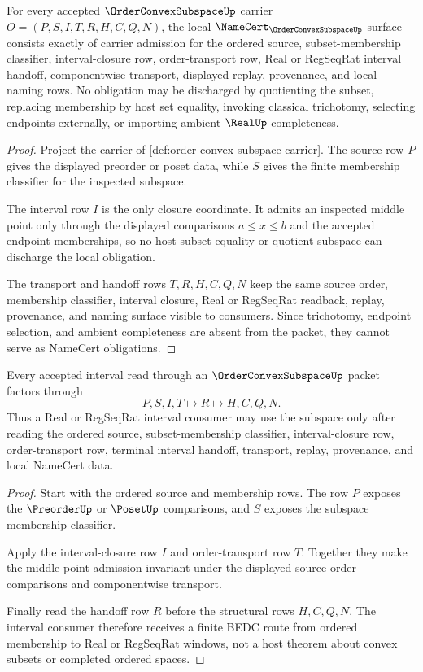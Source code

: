 \begin{theorem}
\label{thm:order-convex-subspace-namecert-obligations}
For every accepted $\OrderConvexSubspaceUp$ carrier $O=(P,S,I,T,R,H,C,Q,N)$, the local $\NameCert_{\OrderConvexSubspaceUp}$ surface consists exactly of carrier admission for the ordered source, subset-membership classifier, interval-closure row, order-transport row, Real or RegSeqRat interval handoff, componentwise transport, displayed replay, provenance, and local naming rows. No obligation may be discharged by quotienting the subset, replacing membership by host set equality, invoking classical trichotomy, selecting endpoints externally, or importing ambient $\RealUp$ completeness.
\end{theorem}
\begin{proof}
Project the carrier of \autoref{def:order-convex-subspace-carrier}. The source row $P$ gives the displayed preorder or poset data, while $S$ gives the finite membership classifier for the inspected subspace.

The interval row $I$ is the only closure coordinate. It admits an inspected middle point only through the displayed comparisons $a\le x\le b$ and the accepted endpoint memberships, so no host subset equality or quotient subspace can discharge the local obligation.

The transport and handoff rows $T,R,H,C,Q,N$ keep the same source order, membership classifier, interval closure, Real or RegSeqRat readback, replay, provenance, and naming surface visible to consumers. Since trichotomy, endpoint selection, and ambient completeness are absent from the packet, they cannot serve as NameCert obligations.
\end{proof}

\begin{theorem}
\label{thm:order-convex-subspace-interval-transport}
Every accepted interval read through an $\OrderConvexSubspaceUp$ packet factors through
$$
P,S,I,T \longmapsto R \longmapsto H,C,Q,N .
$$
Thus a Real or RegSeqRat interval consumer may use the subspace only after reading the ordered source, subset-membership classifier, interval-closure row, order-transport row, terminal interval handoff, transport, replay, provenance, and local NameCert data.
\end{theorem}
\begin{proof}
Start with the ordered source and membership rows. The row $P$ exposes the $\PreorderUp$ or $\PosetUp$ comparisons, and $S$ exposes the subspace membership classifier.

Apply the interval-closure row $I$ and order-transport row $T$. Together they make the middle-point admission invariant under the displayed source-order comparisons and componentwise transport.

Finally read the handoff row $R$ before the structural rows $H,C,Q,N$. The interval consumer therefore receives a finite BEDC route from ordered membership to Real or RegSeqRat windows, not a host theorem about convex subsets or completed ordered spaces.
\end{proof}

